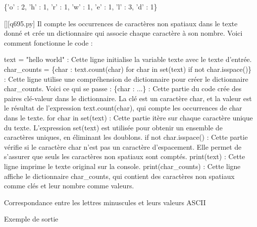 \{'o' : 2, 'h' : 1, 'r' : 1, 'w' : 1, 'e' : 1, 'l' : 3, 'd' : 1\}
        \par
        \begin{solution}
            \renewcommand{\nomfichier}{q695.py}
            \pythonfile{\chemincode \nomfichier}[][\nomfichier]
            Il compte les occurrences de caractères non spatiaux dans le texte donné et crée un dictionnaire qui associe chaque caractère à son nombre. Voici comment fonctionne le code :

    text = "hello world" : Cette ligne initialise la variable texte avec le texte d'entrée.
    char\_counts = \{char : text.count(char) for char in set(text) if not char.isspace()\} : Cette ligne utilise une compréhension de dictionnaire pour créer le dictionnaire char\_counts. Voici ce qui se passe :
        \{char : ...\} : Cette partie du code crée des paires clé-valeur dans le dictionnaire. La clé est un caractère char, et la valeur est le résultat de l'expression text.count(char), qui compte les occurrences de char dans le texte.
        for char in set(text) : Cette partie itère sur chaque caractère unique du texte. L'expression set(text) est utilisée pour obtenir un ensemble de caractères uniques, en éliminant les doublons.
        if not char.isspace() : Cette partie vérifie si le caractère char n'est pas un caractère d'espacement. Elle permet de s'assurer que seuls les caractères non spatiaux sont comptés.
    print(text) : Cette ligne imprime le texte original sur la console.
    print(char\_counts) : Cette ligne affiche le dictionnaire char\_counts, qui contient des caractères non spatiaux comme clés et leur nombre comme valeurs.
        \end{solution}
        

        \question
        Correspondance entre les lettres minuscules et leurs valeurs ASCII

Exemple de sortie

